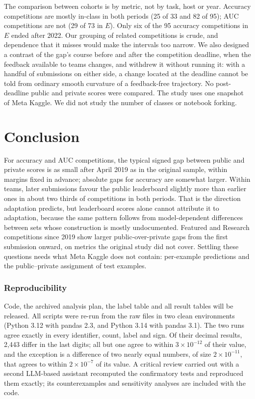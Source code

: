 \documentclass[10pt]{article}
\begin{document}
The comparison between cohorts is by metric, not by task, host or year. Accuracy competitions are mostly in-class in both periods (25 of 33 and 82 of 95); AUC competitions are not (29 of 73 in $E$). Only six of the 95 accuracy competitions in $E$ ended after 2022. Our grouping of related competitions is crude, and dependence that it misses would make the intervals too narrow. We also designed a contrast of the gap's course before and after the competition deadline, when the feedback available to teams changes, and withdrew it without running it: with a handful of submissions on either side, a change located at the deadline cannot be told from ordinary smooth curvature of a feedback-free trajectory. No post-deadline public and private scores were compared. The study uses one snapshot of Meta Kaggle. We did not study the number of classes or notebook forking.

\section{Conclusion}

For accuracy and AUC competitions, the typical signed gap between public and private scores is as small after April 2019 as in the original sample, within margins fixed in advance; absolute gaps for accuracy are somewhat larger. Within teams, later submissions favour the public leaderboard slightly more than earlier ones in about two thirds of competitions in both periods. That is the direction adaptation predicts, but leaderboard scores alone cannot attribute it to adaptation, because the same pattern follows from model-dependent differences between sets whose construction is mostly undocumented. Featured and Research competitions since 2019 show larger public-over-private gaps from the first submission onward, on metrics the original study did not cover. Settling these questions needs what Meta Kaggle does not contain: per-example predictions and the public--private assignment of test examples.

\subsubsection*{Reproducibility}
Code, the archived analysis plan, the label table and all result tables will be released. All scripts were re-run from the raw files in two clean environments (Python 3.12 with pandas 2.3, and Python 3.14 with pandas 3.1). The two runs agree exactly in every identifier, count, label and sign. Of their decimal results, 2,443 differ in the last digits; all but one agree to within $3\times10^{-12}$ of their value, and the exception is a difference of two nearly equal numbers, of size $2\times10^{-11}$, that agrees to within $2\times10^{-7}$ of its value. A critical review carried out with a second LLM-based assistant recomputed the confirmatory tests and reproduced them exactly; its counterexamples and sensitivity analyses are included with the code.




\appendix

\end{document}
